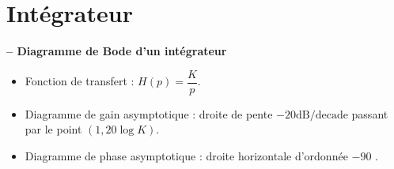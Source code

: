 \section{Intégrateur}
\begin{resultat}\textbf{\textsf{\small -- Diagramme de Bode d'un intégrateur}}~\\



\noindent\begin{minipage}[c]{.53\linewidth}
\begin{itemize}
\item Fonction de transfert : $H(p)=\dfrac{K}{p}$.
\item Diagramme de gain asymptotique : droite de pente $-{20}\text{dB/decade}$ passant par le point $(1,20\log K)$.
\item Diagramme de phase asymptotique : droite horizontale d'ordonnée $-90$ \degre.
\end{itemize}
\end{minipage} \hfill
\begin{minipage}[c]{.45\linewidth}
\end{minipage}
\end{resultat}

\vspace{-.8cm}

